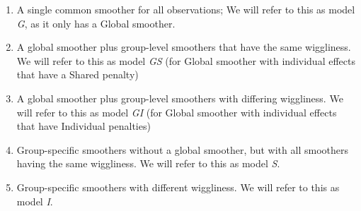 \documentclass[12pt]{article}
\providecommand{\tightlist}{%
  \setlength{\itemsep}{0pt}\setlength{\parskip}{0pt}}
\begin{document}
\begin{enumerate}
\def\labelenumi{\arabic{enumi}.}
\tightlist
\item
  A single common smoother for all observations; We will refer to this
  as model \emph{G}, as it only has a Global smoother.
\item
  A global smoother plus group-level smoothers that have the same
  wiggliness. We will refer to this as model \emph{GS} (for Global
  smoother with individual effects that have a Shared penalty)
\item
  A global smoother plus group-level smoothers with differing
  wiggliness. We will refer to this as model \emph{GI} (for Global
  smoother with individual effects that have Individual penalties)
\item
  Group-specific smoothers without a global smoother, but with all
  smoothers having the same wiggliness. We will refer to this as model
  \emph{S}.
\item
  Group-specific smoothers with different wiggliness. We will refer to
  this as model \emph{I}.
\end{enumerate}
\end{document}
